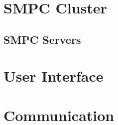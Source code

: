 
\section{SMPC Cluster}\label{s:impl-smpc-cluster}

\subsection{SMPC Servers}\label{ss:smpc-cluster-servers}





\section{User Interface}\label{s:impl-ui}




\section{Communication}\label{s:impl-communication}


